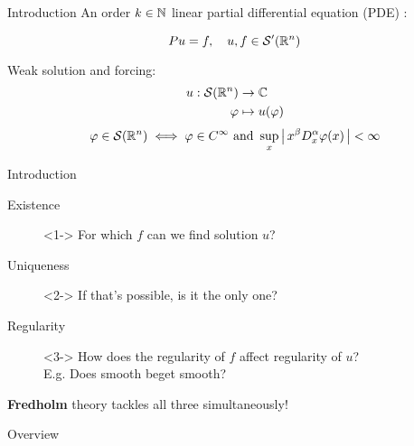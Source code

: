 \documentclass{beamer}
\begin{document}
\begin{frame}{Introduction}
An order $k \in {\ensuremath {\mathbb N}}$ linear partial differential equation (PDE) : 

\begin{equation*}
P u = f, \quad u, f \in \mathcal{S}'({\mathbb R}^n)
\end{equation*}


Weak solution and forcing: 
\begin{align*}
u : \mathcal{S}({\mathbb R}^n) & \to {\ensuremath {\mathbb C}} \\
\varphi &\mapsto u(\varphi)
\end{align*}
\begin{align*}
\varphi  \in \mathcal{S}({\mathbb R}^n)  \iff 
 \varphi \in C^\infty \text{ and }  \sup_{x} \left|\, x^\beta D^\alpha_x \varphi (x)\,\right| < \infty 
\end{align*}

\end{frame} 


\begin{frame}{Introduction}
\begin{description}
    \item[Existence]<1-> For which $f$ can we find solution $u$? 
    \item[Uniqueness ]<2->  If that's possible,  is it the only one? 
    \item[Regularity ]<3-> How does the regularity of $f$ affect regularity of $u$? \\
    E.g. Does smooth beget smooth? 
\end{description}

 \textbf{Fredholm} theory tackles all three simultaneously! 

\end{frame} 



\begin{frame}{Overview}
\tableofcontents
\end{frame}

\end{document}
